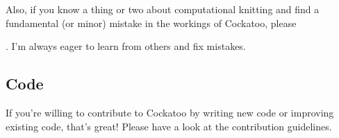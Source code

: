\documentclass[letterpaper,10pt,english]{sphinxmanual}
\begin{document}
Also, if you know a thing or two about computational knitting and find a
fundamental (or minor) mistake in the workings of Cockatoo, please %
\begin{footnote}[34]\sphinxAtStartFootnote
{}
%
\end{footnote}. I’m always eager
to learn from others and fix mistakes.


\subsection{Code}
\label{\detokenize{README:code}}
If you’re willing to contribute to Cockatoo by writing new code or
improving existing code, that’s great! Please have a look at the
contribution guidelines.
\end{document}
